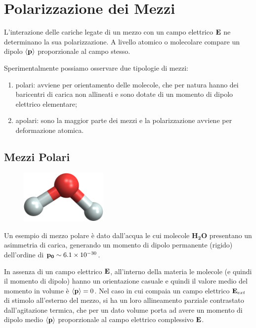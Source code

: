 \section{Polarizzazione dei Mezzi}

L'interazione delle cariche legate di un mezzo con un campo elettrico $\bold{E}$ ne determinano la sua polarizzazione. A livello atomico o molecolare compare un dipolo $\langle \bold{p} \rangle $ proporzionale al campo stesso.

Sperimentalmente possiamo osservare due tipologie di mezzi:

\begin{enumerate}
	\item polari: avviene per orientamento delle molecole, che per natura hanno dei baricentri di carica non allineati e sono dotate di un momento di dipolo elettrico elementare;
	\item apolari: sono la maggior parte dei mezzi e la polarizzazione avviene per deformazione atomica.
\end{enumerate}

\subsection{Mezzi Polari}
\begin{figure} %
    \centering
    \includegraphics[width=0.38\textwidth]{images/water} %
\end{figure}
Un esempio di mezzo polare \`e dato dall'acqua le cui molecole $\bm{H_2O}$ presentano un asimmetria di carica, generando un momento di dipolo permanente (rigido) dell'ordine di $\bold{p_0} \sim 6.1 \times 10^{-30}$.  

In assenza di un campo elettrico $\bold{E}$, all'interno della materia le molecole (e quindi il momento di dipolo) hanno un orientazione casuale e quindi il valore medio del momento in volume \`e $\langle \bold{p} \rangle = 0$. Nel caso in cui compaia un campo elettrico $\bold{E}_{ext}$ di stimolo all'esterno del mezzo, si ha un loro allineamento parziale contrastato dall'agitazione termica, che per un dato volume porta ad avere un momento di dipolo medio $\langle \bold{p} \rangle $ proporzionale al campo elettrico complessivo $\bold{E}$.
\newline

